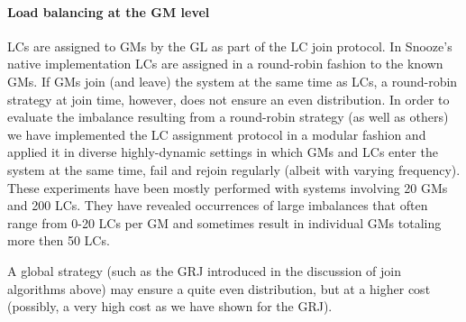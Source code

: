 \paragraph{Load balancing at the GM level}

LCs are assigned to GMs by the GL as part of the LC join protocol. In
Snooze's native implementation LCs are assigned in a round-robin
fashion to the known GMs. If GMs join (and leave) the system at the
same time as LCs, a round-robin strategy at join time, however, does
not ensure an even distribution. In order to evaluate the imbalance
resulting from a round-robin strategy (as well as others) we have
implemented the LC assignment protocol in a modular fashion and
applied it in diverse highly-dynamic settings in which GMs and LCs
enter the system at the same time, fail and rejoin regularly (albeit
with varying frequency). These experiments have been mostly performed
with systems involving 20 GMs and 200 LCs. They have revealed
occurrences of large imbalances that often range from 0-20 LCs per GM
and sometimes result in individual GMs totaling more then 50 LCs.

A global strategy (such as the GRJ introduced in the discussion of
join algorithms above) may ensure a quite even distribution, but at a
higher cost (possibly, a very high cost as we have shown for the GRJ).





